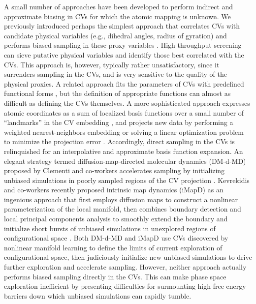 \documentclass[12pt]{article}
\newcommand*{\groen}[1]{#1}
\begin{document}
A small number of approaches have been developed to perform indirect and approximate biasing in CVs for which the atomic mapping is unknown. We previously introduced perhaps the simplest approach that correlates CVs with candidate physical variables (e.g., dihedral angles, radius of gyration) and performs biased sampling in these proxy variables \cite{ferguson2011integrating}. High-throughput screening can sieve putative physical variables and identify those best correlated with the CVs\cite{ma2005automatic,peters2006obtaining,peters2007extensions}. This approach is, however, typically rather unsatisfactory, since it surrenders sampling in the CVs, and is very sensitive to the quality of the physical proxies. A related approach fits the parameters of CVs with predefined functional forms \cite{abrams2012fly}, but the definition of appropriate functions can almost as difficult as defining the CVs themselves. A more sophisticated approach expresses atomic coordinates as a sum of localized basis functions over a small number of ``landmarks'' in the CV embedding \cite{hashemian2013modeling,li2006version,spiwok2011metadynamics,branduardi2007b}, and projects new data by performing a weighted nearest-neighbors embedding \cite{spiwok2011metadynamics,branduardi2007b} or solving a linear optimization problem to minimize the projection error \cite{hashemian2013modeling,li2006version}. Accordingly, direct sampling in the CVs is relinquished for an interpolative and approximate basis function expansion\cite{ferguson2011nonlinear}. An elegant strategy termed diffusion-map-directed molecular dynamics (\groen{DM-d-MD}) proposed by Clementi and co-workers accelerates sampling by initializing unbiased simulations in poorly sampled regions of the CV projection \cite{preto2014fast,zheng2013rapid}. Kevrekidis and co-workers recently proposed intrinsic map dynamics (\groen{iMapD}) as an ingenious approach that first employs diffusion maps to construct a nonlinear parameterization of the local manifold, then combines boundary detection and local principal components analysis to smoothly extend the boundary and initialize short bursts of unbiased simulations in unexplored regions of configurational space \cite{chiavazzo2017intrinsic}. Both DM-d-MD and iMapD use CVs discovered by nonlinear manifold learning to define the limits of current exploration of configurational space, then judiciously initialize new unbiased simulations to drive further exploration and accelerate sampling. However, neither approach actually performs biased sampling directly in the CVs. This can make phase space exploration inefficient by presenting difficulties for surmounting high free energy barriers down which unbiased simulations can rapidly tumble.
\end{document}
